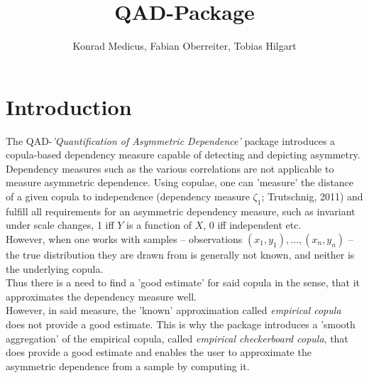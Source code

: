 \documentclass{scrartcl}\usepackage[]{graphicx}\usepackage[]{color}
\author{Konrad Medicus, Fabian Oberreiter, Tobias Hilgart}
\begin{document}
\title{QAD-Package}

\maketitle

\section{Introduction}

The QAD-\textit{'Quantification of Asymmetric Dependence'} package introduces a copula-based dependency measure capable of detecting and depicting asymmetry.\\
Dependency measures such as the various correlations are not applicable to measure asymmetric dependence. Using copulae, one can 'measure' the distance of a given copula to independence (dependency measure $\zeta_1$; Trutschnig, 2011) and fulfill all requirements for an asymmetric dependency measure, such as invariant under scale changes, 1 iff $Y$ is a function of $X$, 0 iff independent etc.\\
However, when one works with samples -- observations $(x_1,y_1),\dots,(x_n,y_n)$ -- the true distribution they are drawn from is generally not known, and neither is the underlying copula.\\
Thus there is a need to find a 'good estimate' for said copula in the sense, that it approximates the dependency measure well.\\
However, in said measure, the 'known' approximation called \textit{empirical copula} does not provide a good estimate. This is why the package introduces a 'smooth aggregation' of the empirical copula, called \textit{empirical checkerboard copula}, that does provide a good estimate and enables the user to approximate the asymmetric dependence from a sample by computing it.
\end{document}
